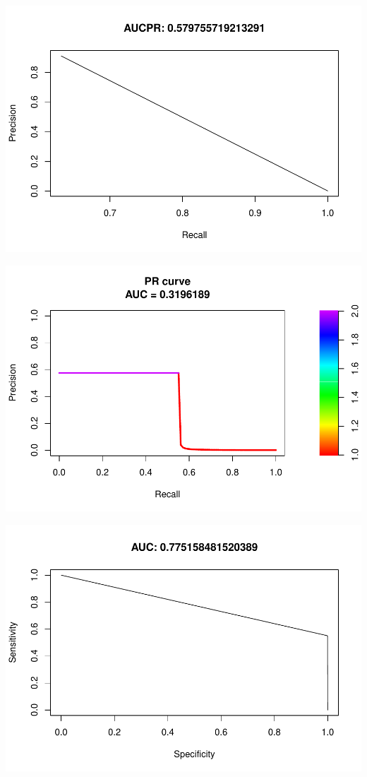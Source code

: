 \documentclass[]{article}
\begin{document}
\begin{center}\includegraphics{Credit_Card_Fraud_Detection_Project_Report_files/figure-latex/unnamed-chunk-25-12} \end{center}

\begin{center}\includegraphics{Credit_Card_Fraud_Detection_Project_Report_files/figure-latex/unnamed-chunk-25-13} \end{center}

\begin{center}\includegraphics{Credit_Card_Fraud_Detection_Project_Report_files/figure-latex/unnamed-chunk-25-14} \end{center}
\end{document}
